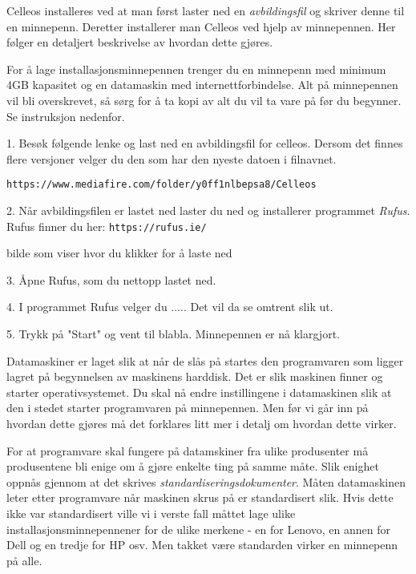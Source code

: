 Celleos installeres ved at man f\o rst laster ned en {\it avbildingsfil} og skriver denne til en minnepenn. Deretter installerer man Celleos ved hjelp av minnepennen. Her f\o lger en detaljert beskrivelse av hvordan dette gj\o res.


For \aa{} lage installasjonsminnepennen trenger du en minnepenn med minimum 4GB kapasitet og en datamaskin med internettforbindelse. Alt p\aa{} minnepennen vil bli overskrevet, s\aa{} s\o rg for \aa{} ta kopi av alt du vil ta vare p\aa{} f\o r du begynner. Se instruksjon nedenfor.
\item{1.} Bes\o k f\o lgende lenke og last ned en avbildingsfil for celleos. Dersom det finnes flere versjoner velger du den som har den nyeste datoen i filnavnet.

\vskip 4pt

{\tt https://www.mediafire.com/folder/y0ff1nlbepsa8/Celleos}

\vskip 4pt

\item{2.} N\aa r avbildingsfilen er lastet ned laster du ned og installerer programmet {\it Rufus}. Rufus finner du her:
\vskip 4pt
{\tt https://rufus.ie/}

\centerline{
\epsfxsize 6cm
}

bilde som viser hvor du klikker for \aa{} laste ned
\item{3.} \AA pne Rufus, som du nettopp lastet ned.
\item{4.} I programmet Rufus velger du .....
Det vil da se omtrent slik ut.
\item{5.} Trykk p\aa{} "Start" og vent til blabla. Minnepennen er n\aa{} klargjort.


Datamaskiner er laget slik at n\aa r de sl\aa s p\aa{} startes den programvaren som ligger lagret p\aa{} begynnelsen av maskinens harddisk. Det er slik maskinen finner og starter operativsystemet. Du skal n\aa{} endre instillingene i datamaskinen slik at den i stedet starter programvaren p\aa{} minnepennen. Men f\o r vi g\aa r inn p\aa{} hvordan dette gj\o res m\aa{} det forklares litt mer i detalj om hvordan dette virker.

For at programvare skal fungere p\aa{} datamskiner fra ulike produsenter m\aa{} produsentene bli enige om  \aa{} gj\o re enkelte ting p\aa{} samme m\aa te. Slik enighet oppn\aa s gjennom at det skrives {\it standardiseringsdokumenter}. M\aa ten datamaskinen leter etter programvare n\aa r maskinen skrus p\aa{} er standardisert slik. Hvis dette ikke var standardisert ville vi i verste fall m\aa ttet lage ulike installasjonsminnepennener for de ulike merkene - en for Lenovo, en annen for Dell og  en tredje for HP osv. Men takket v\ae re standarden virker en minnepenn p\aa{} alle.

